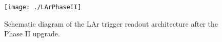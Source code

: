 

\begin{figure}[h!]
  \centering
	\texttt{[image: ./LArPhaseII]}
\caption{\label{fig:larPhaseII}{Schematic diagram of the LAr trigger readout architecture after the Phase II upgrade\cite{LArPhaseIItdr}.}}
\end{figure}



